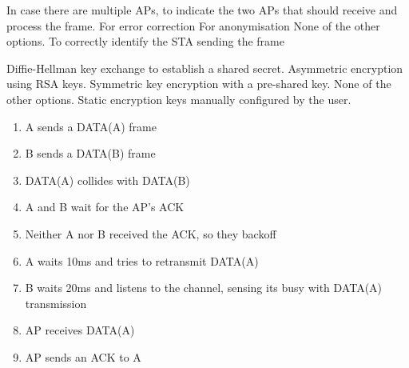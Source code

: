 \begin{checkboxes}
    \choice In case there are multiple APs, to indicate the two APs that should receive and process the frame.
    \choice For error correction
    \choice For anonymisation
    \CorrectChoice None of the other options.
    \choice To correctly identify the STA sending the frame
\end{checkboxes}

\begin{checkboxes}
    \CorrectChoice Diffie-Hellman key exchange to establish a shared secret.
    \choice Asymmetric encryption using RSA keys.
    \choice Symmetric key encryption with a pre-shared key.
    \choice None of the other options.
    \choice Static encryption keys manually configured by the user.
\end{checkboxes}

\begin{solution}
    \begin{enumerate}
        \item A sends a DATA(A) frame
        \item B sends a DATA(B) frame
        \item DATA(A) collides with DATA(B)
        \item A and B wait for the AP's ACK
        \item Neither A nor B received the ACK, so they backoff
        \item A waits 10ms and tries to retransmit DATA(A)
        \item B waits 20ms and listens to the channel, sensing its busy with DATA(A) transmission
        \item AP receives DATA(A)
        \item AP sends an ACK to A
    \end{enumerate}
\end{solution}


